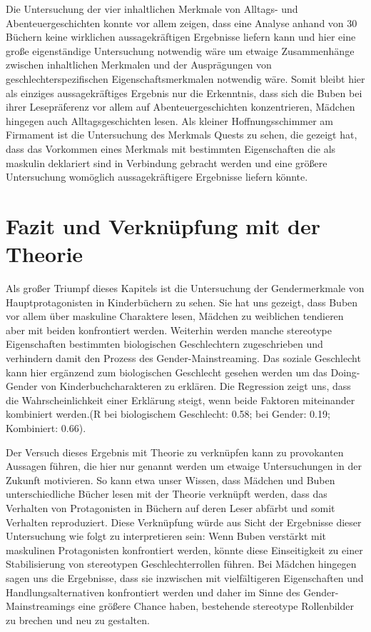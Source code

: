 Die Untersuchung der vier inhaltlichen Merkmale von Alltags- und
Abenteuergeschichten konnte vor allem zeigen, dass eine Analyse anhand
von 30 Büchern keine wirklichen aussagekräftigen Ergebnisse liefern kann
und hier eine große eigenständige Untersuchung notwendig wäre um etwaige
Zusammenhänge zwischen inhaltlichen Merkmalen und der Ausprägungen von
geschlechterspezifischen Eigenschaftsmerkmalen notwendig wäre. Somit
bleibt hier als einziges aussagekräftiges Ergebnis nur die Erkenntnis,
dass sich die Buben bei ihrer Lesepräferenz vor allem auf
Abenteuergeschichten konzentrieren, Mädchen hingegen auch
Alltagsgeschichten lesen. Als kleiner Hoffnungsschimmer am Firmament ist
die Untersuchung des Merkmals Quests zu sehen, die gezeigt hat, dass das
Vorkommen eines Merkmals mit bestimmten Eigenschaften die als maskulin
deklariert sind in Verbindung gebracht werden und eine größere
Untersuchung womöglich aussagekräftigere Ergebnisse liefern könnte.

\section{Fazit und Verknüpfung mit der Theorie}

Als großer Triumpf dieses Kapitels ist die Untersuchung der
Gendermerkmale von Hauptprotagonisten in Kinderbüchern zu sehen. Sie hat
uns gezeigt, dass Buben vor allem über maskuline Charaktere lesen,
Mädchen zu weiblichen tendieren aber mit beiden konfrontiert werden.
Weiterhin werden manche stereotype Eigenschaften bestimmten biologischen
Geschlechtern zugeschrieben und verhindern damit den Prozess des
Gender-Mainstreaming. Das soziale Geschlecht kann hier ergänzend zum
biologischen Geschlecht gesehen werden um das Doing-Gender von
Kinderbuchcharakteren zu erklären. Die Regression zeigt uns, dass die
Wahrscheinlichkeit einer Erklärung steigt, wenn beide Faktoren
miteinander kombiniert werden.(R bei biologischem Geschlecht: 0.58; bei
Gender: 0.19; Kombiniert: 0.66).

Der Versuch dieses Ergebnis mit Theorie zu verknüpfen kann zu
provokanten Aussagen führen, die hier nur genannt werden um etwaige
Untersuchungen in der Zukunft motivieren. So kann etwa unser Wissen,
dass Mädchen und Buben unterschiedliche Bücher lesen mit der Theorie
verknüpft werden, dass das Verhalten von Protagonisten in Büchern auf
deren Leser abfärbt und somit Verhalten reproduziert. Diese Verknüpfung
würde aus Sicht der Ergebnisse dieser Untersuchung wie folgt zu
interpretieren sein: Wenn Buben verstärkt mit maskulinen Protagonisten
konfrontiert werden, könnte diese Einseitigkeit zu einer Stabilisierung
von stereotypen Geschlechterrollen führen. Bei Mädchen hingegen sagen
uns die Ergebnisse, dass sie inzwischen mit vielfältigeren Eigenschaften
und Handlungsalternativen konfrontiert werden und daher im Sinne des
Gender-Mainstreamings eine größere Chance haben, bestehende stereotype
Rollenbilder zu brechen und neu zu gestalten.

